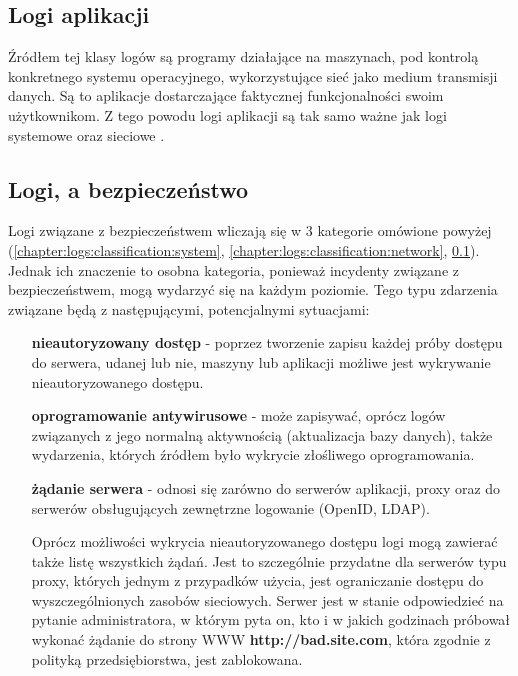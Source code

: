     \subsection{Logi aplikacji}
    \label{chapter:logs:classification:application}
    Źródłem tej klasy logów są programy działające na maszynach, pod kontrolą konkretnego
    systemu operacyjnego, wykorzystujące sieć jako medium transmisji danych. Są to
    aplikacje dostarczające faktycznej funkcjonalności swoim użytkownikom. Z tego powodu
    logi aplikacji są tak samo ważne jak logi systemowe oraz sieciowe \cite{logging_log_management}. 
    
    \subsection{Logi, a bezpieczeństwo}
    \label{chapter:logs:classification:security}
    Logi związane z bezpieczeństwem wliczają się w 3 kategorie omówione powyżej (\ref{chapter:logs:classification:system},
    \ref{chapter:logs:classification:network}, \ref{chapter:logs:classification:application}). Jednak
    ich znaczenie to osobna kategoria, ponieważ incydenty związane z bezpieczeństwem, mogą wydarzyć się
    na każdym poziomie. Tego typu zdarzenia związane będą z następującymi, potencjalnymi sytuacjami:
    \begin{itemize}
        \item[\textbf{nieautoryzowany dostęp}] - poprzez tworzenie zapisu każdej próby dostępu do serwera, udanej lub nie, maszyny lub aplikacji możliwe jest wykrywanie nieautoryzowanego dostępu.
        \item[\textbf{oprogramowanie antywirusowe}] - może zapisywać, oprócz logów związanych z jego normalną aktywnością
        (aktualizacja bazy danych), także wydarzenia, których źródłem było wykrycie złośliwego oprogramowania.
        \item[\textbf{żądanie serwera}] - odnosi się zarówno do serwerów aplikacji, proxy oraz do serwerów
        obsługujących zewnętrzne logowanie (OpenID, LDAP). 
        
        Oprócz możliwości wykrycia nieautoryzowanego dostępu logi mogą zawierać także listę wszystkich żądań. Jest to szczególnie przydatne dla serwerów
        typu proxy, których jednym z przypadków użycia, jest ograniczanie dostępu do wyszczególnionych zasobów
        sieciowych. Serwer jest w stanie odpowiedzieć na pytanie administratora, w którym pyta on, kto  i w jakich
        godzinach próbował wykonać żądanie do strony WWW \textbf{http://bad.site.com}, która zgodnie z
        polityką przedsiębiorstwa, jest zablokowana.
    \end{itemize}